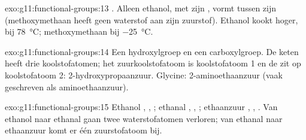 \begin{solution}{exo:g11:functional-groups:13}
. Alleen ethanol, met zijn , vormt 
tussen zijn  (methoxy\-methaan heeft geen waterstof aan zijn
zuurstof). Ethanol kookt hoger, bij \qty{78}{\celsius}; methoxy\-methaan
bij \qty{-25}{\celsius}.
\end{solution}

\begin{solution}{exo:g11:functional-groups:14}
Een hydroxylgroep en een carboxylgroep. De keten heeft drie
koolstofatomen; het zuurkoolstofatoom is koolstofatoom 1 en de 
zit op koolstofatoom 2: 2-hydroxypropaanzuur. Glycine:
2-aminoethaanzuur (vaak geschreven als aminoethaanzuur).
\end{solution}

\begin{solution}{exo:g11:functional-groups:15}
Ethanol , , ; ethanal ,
, ; ethaanzuur , ,
. Van ethanol naar ethanal gaan twee waterstofatomen verloren;
van ethanal naar ethaanzuur komt er één zuurstofatoom bij.
\end{solution}

